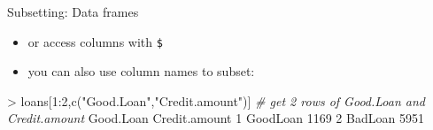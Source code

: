 \documentclass[
  ignorenonframetext,
]{beamer}
\newenvironment{Shaded}{\begin{snugshade}}{\end{snugshade}}
\newcommand{\CommentTok}[1]{\textcolor[rgb]{0.56,0.35,0.01}{\textit{#1}}}
\newcommand{\DecValTok}[1]{\textcolor[rgb]{0.00,0.00,0.81}{#1}}
\newcommand{\FunctionTok}[1]{\textcolor[rgb]{0.00,0.00,0.00}{#1}}
\newcommand{\NormalTok}[1]{#1}
\newcommand{\SpecialCharTok}[1]{\textcolor[rgb]{0.00,0.00,0.00}{#1}}
\newcommand{\StringTok}[1]{\textcolor[rgb]{0.31,0.60,0.02}{#1}}
\providecommand{\tightlist}{%
  \setlength{\itemsep}{0pt}\setlength{\parskip}{0pt}}
\begin{document}
\begin{frame}[fragile]{Subsetting: Data frames}
\protect\hypertarget{subsetting-data-frames-2}{}
\begin{itemize}[<+->]
\tightlist
\item
  or access columns with \texttt{\$}
\end{itemize}

\begin{Shaded}
\end{Shaded}

\begin{itemize}[<+->]
\tightlist
\item
  you can also use column names to subset:
\end{itemize}

\begin{Shaded}
\begin{Highlighting}[]
\SpecialCharTok{\textgreater{}}\NormalTok{ loans[}\DecValTok{1}\SpecialCharTok{:}\DecValTok{2}\NormalTok{,}\FunctionTok{c}\NormalTok{(}\StringTok{"Good.Loan"}\NormalTok{,}\StringTok{"Credit.amount"}\NormalTok{)] }\CommentTok{\# get 2 rows of Good.Loan and Credit.amount}
\NormalTok{  Good.Loan Credit.amount}
\DecValTok{1}\NormalTok{  GoodLoan          }\DecValTok{1169}
\DecValTok{2}\NormalTok{   BadLoan          }\DecValTok{5951}
\end{Highlighting}
\end{Shaded}
\end{frame}
\end{document}
